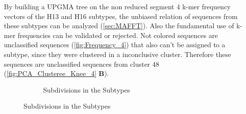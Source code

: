 By building a \gls{UPGMA} tree on the non reduced segment 4 k-mer frequency vectors of the H13 and H16 subtypes, the unbiased relation of sequences from these subtypes can be analyzed (\autoref{sec:MAFFT}). Also the fundamental use of k-mer frequencies can be validated or rejected. Not colored sequences are unclassified sequences (\autoref{fig:Frequency_4}) that also can't be assigned to a subtype, since they were clustered in a inconclusive cluster. Therefore these sequences are unclassified sequences from cluster 48 (\autoref{fig:PCA_Clusteree_Knee_4} \textbf{\textsf{B}}).

\begin{figure}[!hbt]
    \centering
    \begin{subfigure}[t]{0.475\textwidth}
        \caption{Subdivisions in the Subtypes}
        \label{subfig:root} 
        

\end{subfigure}
\end{figure}
